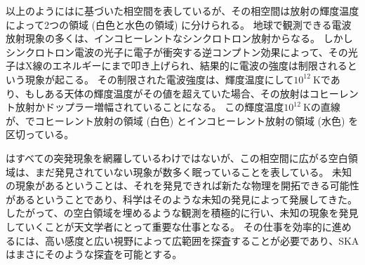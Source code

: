 以上のようにはに基づいた相空間を表しているが、その相空間は放射の輝度温度によって2つの領域 (白色と水色の領域) に分けられる。
地球で観測できる電波放射現象の多くは、インコヒーレントなシンクロトロン放射からなる。
しかしシンクロトロン電波の光子に電子が衝突する逆コンプトン効果によって、その光子はX線のエネルギーにまで叩き上げられ、結果的に電波の強度は制限されるという現象が起こる。
その制限された電波強度は、輝度温度にして$10^{12}~\text{K}$であり、もしある天体の輝度温度がその値を超えていた場合、その放射はコヒーレント放射かドップラー増幅されていることになる。
この輝度温度$10^{12}~\text{K}$の直線が、でコヒーレント放射の領域 (白色) とインコヒーレント放射の領域 (水色) を区切っている。

はすべての突発現象を網羅しているわけではないが、この相空間に広がる空白領域は、まだ発見されていない現象が数多く眠っていることを表している。
未知の現象があるということは、それを発見できれば新たな物理を開拓できる可能性があるということであり、科学はそのような未知の発見によって発展してきた。
したがって、の空白領域を埋めるような観測を積極的に行い、未知の現象を発見していくことが天文学者にとって重要な仕事となる。
その仕事を効率的に進めるには、高い感度と広い視野によって広範囲を探査することが必要であり、SKAはまさにそのような探査を可能とする。

